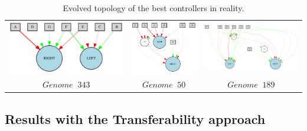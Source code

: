 \begin{table}[h]
\begin{tabular}{ccc}
\includegraphics[scale=0.3]{include/images/thymio_network_343.PNG} & \includegraphics[scale=0.3]{include/images/thymio_network_50.PNG} & \includegraphics[scale=0.3]{include/images/thymio_network_189.PNG} \\
$Genome \;  \; 343$  & $Genome \;  \; 50$  & $Genome \;  \; 189$  \\
\end{tabular}
\caption{Evolved topology of the best controllers in reality.}
\label{fig:thymio_network_topologies} %
\end{table}


\subsection{Results with the Transferability approach}

